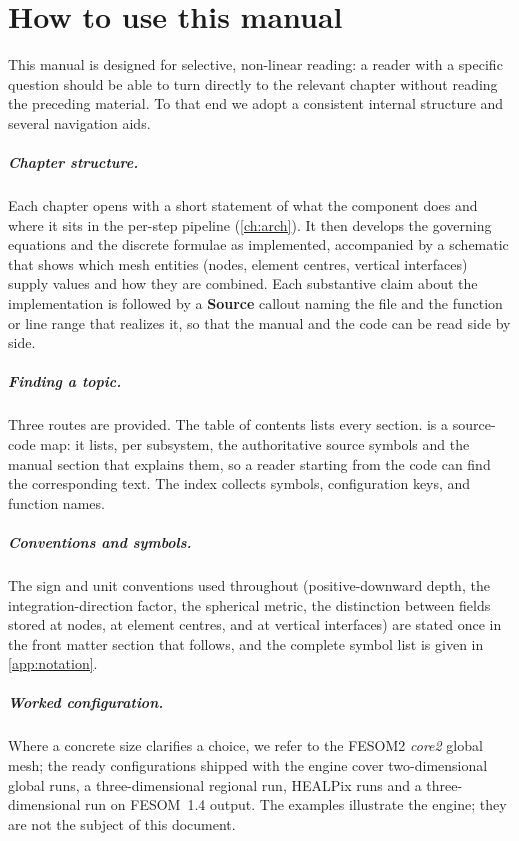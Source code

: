 \chapter*{How to use this manual}

This manual is designed for selective, non-linear reading: a reader with a
specific question should be able to turn directly to the relevant chapter without
reading the preceding material. To that end we adopt a consistent internal
structure and several navigation aids.

\paragraph{Chapter structure.} Each chapter opens with a short statement of what
the component does and where it sits in the per-step pipeline
(\cref{ch:arch}). It then develops the governing equations and the discrete
formulae as implemented, accompanied by a schematic that shows which mesh
entities (nodes, element centres, vertical interfaces) supply values and how they
are combined. Each substantive claim about the implementation is followed by a
\textbf{Source} callout naming the file and the function or line range that
realizes it, so that the manual and the code can be read side by side.

\paragraph{Finding a topic.} Three routes are provided. The table of contents
lists every section.  is a source-code map: it lists, per
subsystem, the authoritative source symbols and the manual section that explains
them, so a reader starting from the code can find the corresponding text. The
index collects symbols, configuration keys, and function names.

\paragraph{Conventions and symbols.} The sign and unit conventions used
throughout (positive-downward depth, the integration-direction factor, the
spherical metric, the distinction between fields stored at nodes, at element
centres, and at vertical interfaces) are stated once in the front matter section
that follows, and the complete symbol list is given in \cref{app:notation}.

\paragraph{Worked configuration.} Where a concrete size clarifies a choice, we refer to the FESOM2
\emph{core2} global mesh; the ready configurations shipped with the engine cover two-dimensional global runs,
a three-dimensional regional run, HEALPix runs and a three-dimensional run on
FESOM~1.4 output. The examples illustrate the engine;
they are not the subject of this document.

